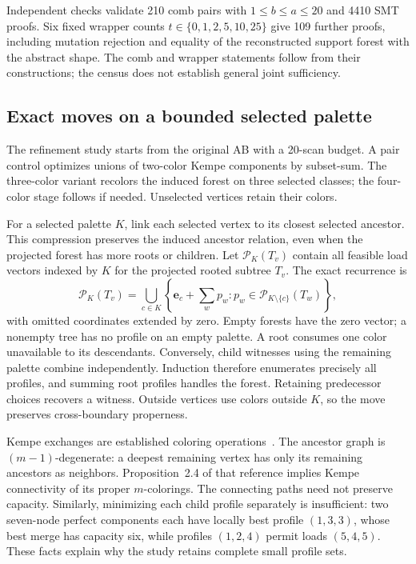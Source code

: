 Independent checks validate 210 comb pairs with $1\le b\le a\le20$
and 4410 SMT proofs. Six fixed wrapper counts
$t\in\{0,1,2,5,10,25\}$ give 109 further proofs, including mutation
rejection and equality of the reconstructed support forest with the
abstract shape. The comb and wrapper statements follow from their
constructions; the census does not establish general joint sufficiency.

\subsection{Exact moves on a bounded selected palette}
\label{sec:construction-neighborhood}
The refinement study starts from the original AB with a 20-scan budget.
A pair control optimizes unions of two-color Kempe components by
subset-sum. The three-color variant recolors the induced forest on
three selected classes; the four-color stage follows if needed.
Unselected vertices retain their colors.

For a selected palette $K$, link each selected vertex to its closest
selected ancestor. This compression preserves the induced ancestor
relation, even when the projected forest has more roots or children.
Let $\mathcal P_K(T_v)$ contain all feasible load vectors indexed by
$K$ for the projected rooted subtree $T_v$. The exact recurrence is
\begin{equation}
 \mathcal P_K(T_v)=
 \bigcup_{c\in K}
 \left\{\mathbf e_c+\sum_{w}p_w:
 p_w\in\mathcal P_{K\setminus\{c\}}(T_w)\right\},
 \label{eq:supp-selected-palette-dp}
\end{equation}
with omitted coordinates extended by zero. Empty forests have the
zero vector; a nonempty tree has no profile on an empty palette.
A root consumes one color unavailable to its descendants. Conversely,
child witnesses using the remaining palette combine independently.
Induction therefore enumerates precisely all profiles, and summing
root profiles handles the forest. Retaining predecessor choices
recovers a witness. Outside vertices use colors outside $K$, so the
move preserves cross-boundary properness.

Kempe exchanges are established coloring operations~\cite{kempeequivalence}.
The ancestor graph is $(m-1)$-degenerate: a deepest remaining vertex
has only its remaining ancestors as neighbors. Proposition~2.4 of
that reference implies Kempe connectivity of its proper $m$-colorings.
The connecting paths need not preserve capacity. Similarly, minimizing
each child profile separately is insufficient: two seven-node perfect
components each have locally best profile $(1,3,3)$, whose best merge
has capacity six, while profiles $(1,2,4)$ permit loads $(5,4,5)$.
These facts explain why the study retains complete small profile sets.

